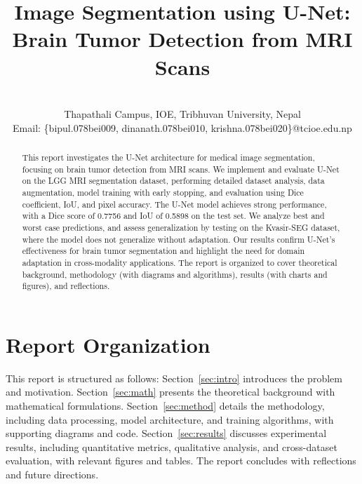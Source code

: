 \documentclass[a4paper, journal]{IEEEtran}
\begin{document}
\title{Image Segmentation using U-Net: Brain Tumor Detection from MRI Scans}

\author{
     \\
    Thapathali Campus, IOE, Tribhuvan University, Nepal\\
    Email: \{bipul.078bei009, dinanath.078bei010, krishna.078bei020\}@tcioe.edu.np\\
}

\maketitle
\begin{abstract}
    This report investigates the U-Net architecture for medical image segmentation, focusing on brain tumor detection from MRI scans. We implement and evaluate U-Net on the LGG MRI segmentation dataset, performing detailed dataset analysis, data augmentation, model training with early stopping, and evaluation using Dice coefficient, IoU, and pixel accuracy. The U-Net model achieves strong performance, with a Dice score of 0.7756 and IoU of 0.5898 on the test set. We analyze best and worst case predictions, and assess generalization by testing on the Kvasir-SEG dataset, where the model does not generalize without adaptation. Our results confirm U-Net's effectiveness for brain tumor segmentation and highlight the need for domain adaptation in cross-modality applications. The report is organized to cover theoretical background, methodology (with diagrams and algorithms), results (with charts and figures), and reflections.
\end{abstract}

\section*{Report Organization}
This report is structured as follows: Section~\ref{sec:intro} introduces the problem and motivation. Section~\ref{sec:math} presents the theoretical background with mathematical formulations. Section~\ref{sec:method} details the methodology, including data processing, model architecture, and training algorithms, with supporting diagrams and code. Section~\ref{sec:results} discusses experimental results, including quantitative metrics, qualitative analysis, and cross-dataset evaluation, with relevant figures and tables. The report concludes with reflections and future directions.
\end{document}

